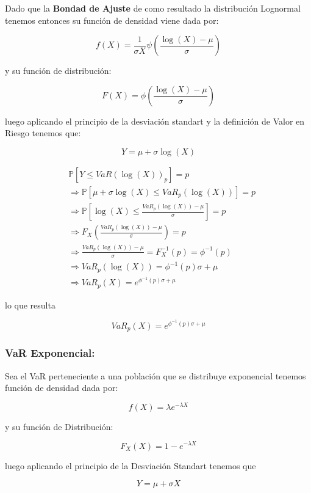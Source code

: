 \documentclass[]{article}
\begin{document}
Dado que la \textbf{Bondad de Ajuste} de como resultado la distribución
Lognormal tenemos entonces su función de densidad viene dada por:

\[f(X)=\frac{1}{\sigma X} \psi(\frac{\log(X)-\mu}{\sigma})\]

y su función de distribución:

\[F(X)=\phi(\frac{\log(X)-\mu}{\sigma})\]

luego aplicando el principio de la desviación standart y la definición
de Valor en Riesgo tenemos que:

\[Y = \mu + \sigma \log(X)\]

\[\begin{array}{rl}  
&\displaystyle \mathbb{P}[Y \leq VaR(\log(X))_p]=p\\
&\displaystyle \Rightarrow \mathbb{P}[\mu + \sigma \log(X) \leq VaR_p(\log(X))] = p\\
&\displaystyle \Rightarrow \mathbb{P}[\log(X) \leq \frac{VaR_{p}(\log(X))- \mu}{\sigma}] = p\\
&\displaystyle \Rightarrow F_X(\frac{VaR_{p}(\log(X))- \mu}{\sigma}) = p\\
&\displaystyle \Rightarrow \frac{VaR_{p}(\log(X))- \mu}{\sigma} = F_X^{-1}(p)=\phi^{-1}(p)\\
&\displaystyle \Rightarrow VaR_{p}(\log(X))=\phi^{-1}(p) \sigma + \mu\\
&\displaystyle \Rightarrow VaR_{p}(X)=e^{\phi^{-1}(p) \sigma + \mu}
\end{array}\]

lo que resulta

\[VaR_{p}(X)=e^{\phi^{-1}(p) \sigma + \mu}\]

\hypertarget{var-exponencial}{%
\subsubsection{\texorpdfstring{\textbf{VaR
Exponencial:}}{VaR Exponencial:}}\label{var-exponencial}}

Sea el VaR perteneciente a una población que se distribuye exponencial
tenemos función de densidad dada por:

\[f(X)= \lambda e^{-\lambda X}\]

y su función de Distribución:

\[F_X(X)= 1-e^{-\lambda X}\]

luego aplicando el principio de la Desviación Standart tenemos que

\[Y = \mu + \sigma X\]
\end{document}
